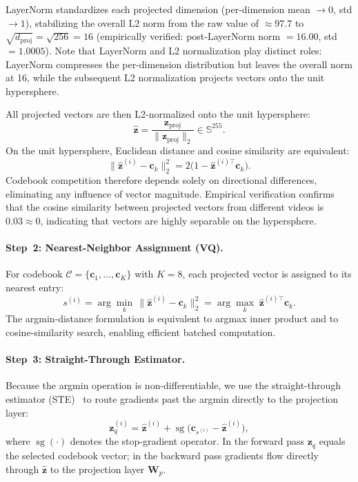 \documentclass{article}
\begin{document}
LayerNorm standardizes each projected dimension (per-dimension mean $\to 0$,
std $\to 1$), stabilizing the overall L2 norm from the raw value of
$\approx\!97.7$ to $\sqrt{d_{\text{proj}}} = \sqrt{256} = 16$ (empirically
verified: post-LayerNorm norm $= 16.00$, std $= 1.0005$).  Note that LayerNorm
and L2 normalization play distinct roles: LayerNorm compresses the per-dimension
distribution but leaves the overall norm at 16, while the subsequent L2
normalization projects vectors onto the unit hypersphere.

All projected vectors are then L2-normalized onto the unit hypersphere:
%
\begin{equation}
  \hat{\mathbf{z}}
  = \frac{\mathbf{z}_{\text{proj}}}{\|\mathbf{z}_{\text{proj}}\|_2}
  \in \mathbb{S}^{255}.
\end{equation}
%
On the unit hypersphere, Euclidean distance and cosine similarity are
equivalent:
%
\begin{equation}
  \|\hat{\mathbf{z}}^{(i)} - \mathbf{c}_k\|_2^2
  = 2\bigl(1 - \hat{\mathbf{z}}^{(i)\top}\mathbf{c}_k\bigr).
\end{equation}
%
Codebook competition therefore depends solely on directional differences,
eliminating any influence of vector magnitude.  Empirical verification confirms
that the cosine similarity between projected vectors from different videos is
$0.03 \approx 0$, indicating that vectors are highly separable on the
hypersphere.

\paragraph{Step~2: Nearest-Neighbor Assignment (VQ).}
For codebook $\mathcal{C} = \{\mathbf{c}_1, \ldots, \mathbf{c}_K\}$ with
$K = 8$, each projected vector is assigned to its nearest entry:
%
\begin{equation}
  s^{(i)}
  = \arg\min_{k}\,\|\hat{\mathbf{z}}^{(i)} - \mathbf{c}_k\|_2^2
  = \arg\max_{k}\;\hat{\mathbf{z}}^{(i)\top}\mathbf{c}_k.
\end{equation}
%
The argmin-distance formulation is equivalent to argmax inner product and to
cosine-similarity search, enabling efficient batched computation.

\paragraph{Step~3: Straight-Through Estimator.}
Because the argmin operation is non-differentiable, we use the
straight-through estimator (STE)~\cite{bengio2013estimating} to route
gradients past the argmin directly to the projection layer:
%
\begin{equation}
  \mathbf{z}_q^{(i)}
  = \hat{\mathbf{z}}^{(i)}
    + \operatorname{sg}\!\bigl(\mathbf{c}_{s^{(i)}} - \hat{\mathbf{z}}^{(i)}\bigr),
\end{equation}
%
where $\operatorname{sg}(\cdot)$ denotes the stop-gradient operator.
In the forward pass $\mathbf{z}_q$ equals the selected codebook vector; in the
backward pass gradients flow directly through $\hat{\mathbf{z}}$ to the
projection layer $\mathbf{W}_p$.
\end{document}
